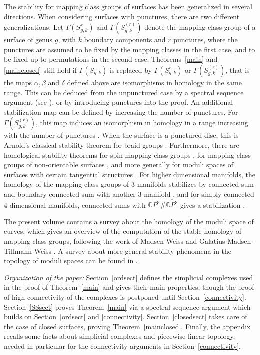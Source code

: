 \documentclass[10pt]{amsart}
\newcommand{\no}{\noindent}
\newcommand{\CC}{\mathbb{C}}
\newcommand{\al}{\alpha}
\newcommand{\Ga}{\Gamma}
\begin{document}
The stability for mapping class groups of surfaces has been generalized in several
directions. When considering surfaces with punctures, there are two different generalizations. 
Let $\Ga(S_{g,k}^r)$ and $\Ga(S_{g,k}^{(r)})$ denote the mapping class group of a surface of genus $g$, with $k$ boundary
components and $r$ punctures, where the punctures are assumed to be fixed by the mapping classes in the first case, and to be
fixed up to permutations in the second case.   
Theorems~\ref{main} and \ref{mainclosed} still hold if $\Ga(S_{g,k})$ is replaced by $\Ga(S_{g,k}^r)$ or $\Ga(S_{g,k}^{(r)})$, 
that is the maps $\al,\beta$ and $\delta$ defined above 
are isomorphisms in homology in the same range. This can be deduced from the unpunctured case by a spectral sequence argument (see
\cite{Han}), or by introducing punctures into the proof. 
An additional stabilization map can be defined by increasing the 
number of punctures. For $\Ga(S_{g,k}^{(r)})$, this map induces an isomorphism in homology in a range increasing with the number of punctures \cite[Prop.~1.5]{HatWah07}. 
When the surface is a punctured disc, this is Arnold's classical stability theorem for braid groups \cite{Arn70}. 
Furthermore, there are homological stability theorems 
for spin mapping class groups \cite{Bau04,Har90}, for mapping class groups of non-orientable surfaces \cite{Wahl08}, 
and more generally for moduli spaces of surfaces with certain tangential structures \cite{RW09}. 
For higher dimensional manifolds, the homology of the mapping class groups of
3-manifolds stabilizes by connected sum and boundary connected sum with another 3-manifold \cite{HatWah07}, 
and for simply-connected 4-dimensional manifolds, connected sums with $\CC P^2\#\overline{\CC
P^2}$ gives a stabilization \cite{Gia08}.  


\smallskip

The present volume contains a survey \cite{Mad10} about the homology of the moduli space of curves, which gives an overview of the
computation of the stable homology of mapping class groups, following the work of Madsen-Weiss and
Galatius-Madsen-Tillmann-Weiss \cite{GMTW,MadWei}. A survey about more general stability phenomena in the topology of moduli spaces
can be found in \cite{Coh10}. 

 




\medskip

\no
{\em Organization of the paper:}  Section~\ref{ordsect} defines the simplicial complexes used in the proof of
Theorem~\ref{main} and gives their main properties, though the proof of high connectivity of the complexes
is postponed until Section~\ref{connectivity}. 
Section~\ref{SSsect} proves Theorem~\ref{main}
via a spectral sequence argument which builds on Section~\ref{ordsect} and \ref{connectivity}. 
Section~\ref{closedsect} takes care of the case of closed surfaces, proving Theorem~\ref{mainclosed}. 
Finally, the appendix recalls some facts about simplicial complexes and piecewise linear topology, needed in particular
for the connectivity arguments in Section~\ref{connectivity}. 
\end{document}
